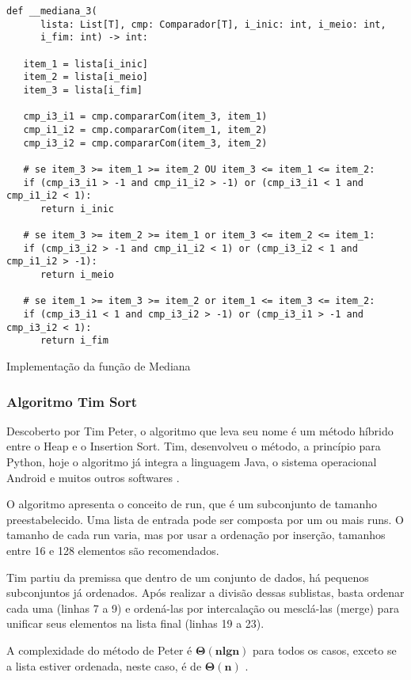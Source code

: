 \documentclass[a4paper,12pt]{scrartcl}
\begin{document}
\begin{listing}[H]
\begin{verbatim}
def __mediana_3(
      lista: List[T], cmp: Comparador[T], i_inic: int, i_meio: int,
      i_fim: int) -> int:

   item_1 = lista[i_inic]
   item_2 = lista[i_meio]
   item_3 = lista[i_fim]
   
   cmp_i3_i1 = cmp.compararCom(item_3, item_1)
   cmp_i1_i2 = cmp.compararCom(item_1, item_2)
   cmp_i3_i2 = cmp.compararCom(item_3, item_2)
   
   # se item_3 >= item_1 >= item_2 OU item_3 <= item_1 <= item_2:
   if (cmp_i3_i1 > -1 and cmp_i1_i2 > -1) or (cmp_i3_i1 < 1 and cmp_i1_i2 < 1): 
      return i_inic

   # se item_3 >= item_2 >= item_1 or item_3 <= item_2 <= item_1:
   if (cmp_i3_i2 > -1 and cmp_i1_i2 < 1) or (cmp_i3_i2 < 1 and cmp_i1_i2 > -1):
      return i_meio

   # se item_1 >= item_3 >= item_2 or item_1 <= item_3 <= item_2:
   if (cmp_i3_i1 < 1 and cmp_i3_i2 > -1) or (cmp_i3_i1 > -1 and cmp_i3_i2 < 1):
      return i_fim
\end{verbatim}
\caption{\footnotesize{Implementação da função de Mediana}}
\end{listing}

\subsubsection{Algoritmo Tim Sort}
Descoberto por Tim Peter, o algoritmo que leva seu nome é um método híbrido entre o Heap e o Insertion Sort. Tim, desenvolveu o método, a princípio para Python, hoje o algoritmo já integra a linguagem Java, o sistema operacional Android e muitos outros softwares \cite{timsort}.

O algoritmo apresenta o conceito de run, que é um subconjunto de tamanho preestabelecido. Uma lista de entrada pode ser composta por um ou mais runs. O tamanho de cada run varia, mas por usar a ordenação por inserção, tamanhos entre 16 e 128 elementos são recomendados.

Tim partiu da premissa que dentro de um conjunto de dados, há pequenos subconjuntos já ordenados. Após realizar a divisão dessas sublistas, basta ordenar cada uma (linhas 7 a 9) e ordená-las por intercalação ou mesclá-las (merge) para unificar seus elementos na lista final (linhas 19 a 23).

A complexidade do método de Peter é $\pmb{\Theta(n lg n)}$ para todos os casos, exceto se a lista estiver ordenada, neste caso, é de $\pmb{\Theta(n)}$ \cite{timsort_comp}.
\end{document}
